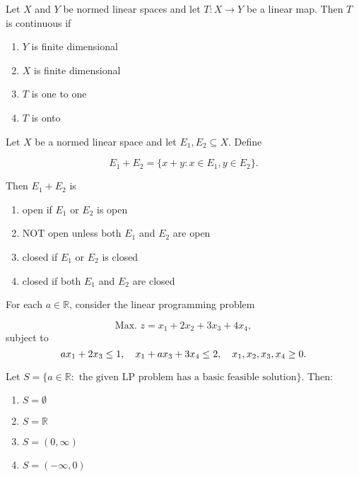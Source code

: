 \item Let $X$ and $Y$ be normed linear spaces and let $T: X \to Y$ be a linear map. Then $T$ is continuous if

\begin{enumerate}
    \item $Y$ is finite dimensional
    \item $X$ is finite dimensional
    \item $T$ is one to one
    \item $T$ is onto
\end{enumerate}
\item Let $X$ be a normed linear space and let $E_1, E_2 \subseteq X$. Define

\begin{equation*}
E_1 + E_2 = \{ x+y : x \in E_1, y \in E_2 \}.
\end{equation*}

Then $E_1 + E_2$ is

\begin{enumerate}
    \item open if $E_1$ or $E_2$ is open
    \item NOT open unless both $E_1$ and $E_2$ are open
    \item closed if $E_1$ or $E_2$ is closed
    \item closed if both $E_1$ and $E_2$ are closed
\end{enumerate}

\item For each $a \in \mathbb{R}$, consider the linear programming problem

\begin{equation*}
\text{Max. } z = x_1 + 2x_2 + 3x_3 + 4x_4,
\end{equation*}
subject to
\begin{equation*}
a x_1 + 2 x_3 \leq 1,\\ \quad x_1 + a x_3 + 3 x_4 \leq 2,\\ \quad x_1, x_2, x_3, x_4 \geq 0.
\end{equation*}

Let $S = \{ a \in \mathbb{R}: \text{ the given LP problem has a basic feasible solution} \}$. Then:

\begin{enumerate}
    \item $S = \emptyset$
    \item $S = \mathbb{R}$
    \item $S = (0, \infty)$
    \item $S = (-\infty, 0)$
\end{enumerate}


